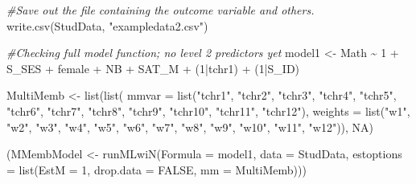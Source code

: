 \documentclass[
]{book}
\newenvironment{Shaded}{\begin{snugshade}}{\end{snugshade}}
\newcommand{\AttributeTok}[1]{\textcolor[rgb]{0.77,0.63,0.00}{#1}}
\newcommand{\CommentTok}[1]{\textcolor[rgb]{0.56,0.35,0.01}{\textit{#1}}}
\newcommand{\ConstantTok}[1]{\textcolor[rgb]{0.00,0.00,0.00}{#1}}
\newcommand{\DecValTok}[1]{\textcolor[rgb]{0.00,0.00,0.81}{#1}}
\newcommand{\FunctionTok}[1]{\textcolor[rgb]{0.00,0.00,0.00}{#1}}
\newcommand{\NormalTok}[1]{#1}
\newcommand{\OtherTok}[1]{\textcolor[rgb]{0.56,0.35,0.01}{#1}}
\newcommand{\SpecialCharTok}[1]{\textcolor[rgb]{0.00,0.00,0.00}{#1}}
\newcommand{\StringTok}[1]{\textcolor[rgb]{0.31,0.60,0.02}{#1}}
\begin{document}
\begin{Shaded}
\begin{Highlighting}[]
\CommentTok{\#Save out the file containing the outcome variable and others.}
\FunctionTok{write.csv}\NormalTok{(StudData, }\StringTok{"exampledata2.csv"}\NormalTok{)}

\CommentTok{\#Checking full model function; no level 2 predictors yet}
\NormalTok{model1 }\OtherTok{\textless{}{-}}\NormalTok{ Math }\SpecialCharTok{\textasciitilde{}} \DecValTok{1} \SpecialCharTok{+}\NormalTok{ S\_SES }\SpecialCharTok{+}\NormalTok{ female }\SpecialCharTok{+}\NormalTok{ NB }\SpecialCharTok{+}\NormalTok{ SAT\_M }\SpecialCharTok{+}\NormalTok{ (}\DecValTok{1}\SpecialCharTok{|}\NormalTok{tchr1) }\SpecialCharTok{+}\NormalTok{ (}\DecValTok{1}\SpecialCharTok{|}\NormalTok{S\_ID)}


\NormalTok{MultiMemb }\OtherTok{\textless{}{-}} \FunctionTok{list}\NormalTok{(}\FunctionTok{list}\NormalTok{(}
  \AttributeTok{mmvar =} \FunctionTok{list}\NormalTok{(}\StringTok{"tchr1"}\NormalTok{, }\StringTok{"tchr2"}\NormalTok{, }\StringTok{"tchr3"}\NormalTok{, }\StringTok{"tchr4"}\NormalTok{, }\StringTok{"tchr5"}\NormalTok{, }\StringTok{"tchr6"}\NormalTok{, }\StringTok{"tchr7"}\NormalTok{, }\StringTok{"tchr8"}\NormalTok{, }\StringTok{"tchr9"}\NormalTok{, }\StringTok{"tchr10"}\NormalTok{, }\StringTok{"tchr11"}\NormalTok{, }\StringTok{"tchr12"}\NormalTok{),}
  \AttributeTok{weights =} \FunctionTok{list}\NormalTok{(}\StringTok{"w1"}\NormalTok{, }\StringTok{"w2"}\NormalTok{, }\StringTok{"w3"}\NormalTok{, }\StringTok{"w4"}\NormalTok{, }\StringTok{"w5"}\NormalTok{, }\StringTok{"w6"}\NormalTok{, }\StringTok{"w7"}\NormalTok{, }\StringTok{"w8"}\NormalTok{, }\StringTok{"w9"}\NormalTok{, }\StringTok{"w10"}\NormalTok{, }\StringTok{"w11"}\NormalTok{, }\StringTok{"w12"}\NormalTok{)), }\ConstantTok{NA}\NormalTok{)}

\NormalTok{(MMembModel }\OtherTok{\textless{}{-}} \FunctionTok{runMLwiN}\NormalTok{(}\AttributeTok{Formula =}\NormalTok{ model1, }\AttributeTok{data =}\NormalTok{ StudData, }\AttributeTok{estoptions =} \FunctionTok{list}\NormalTok{(}\AttributeTok{EstM =} \DecValTok{1}\NormalTok{, }\AttributeTok{drop.data =} \ConstantTok{FALSE}\NormalTok{, }\AttributeTok{mm =}\NormalTok{ MultiMemb)))}
\end{Highlighting}
\end{Shaded}


  
\end{document}
